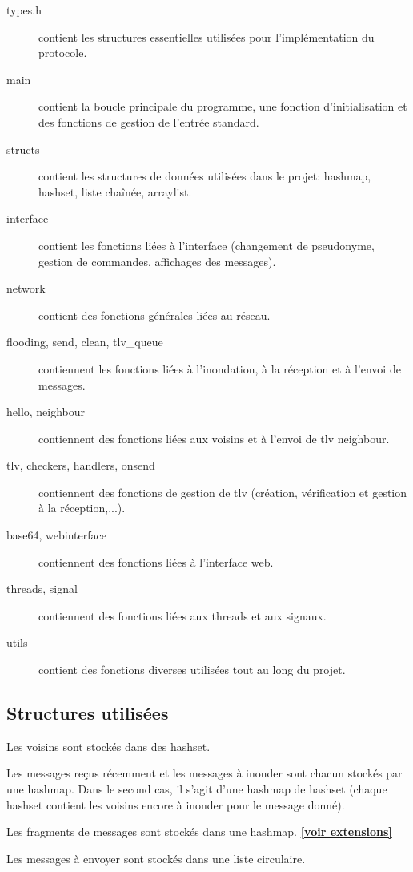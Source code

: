 \documentclass[a4paper,10pt]{article} %
\begin{document}
\begin{description}
\item[types.h] contient les structures essentielles utilisées pour l'implémentation du protocole.
\item[main] contient la boucle principale du programme, une fonction d'initialisation et des fonctions de gestion de l'entrée standard.
\item[structs] contient les structures de données utilisées dans le projet: hashmap, hashset, liste chaînée, arraylist.
\item[interface] contient les fonctions liées à l'interface (changement de pseudonyme, gestion de commandes, affichages des messages).
\item[network] contient des fonctions générales liées au réseau.
\item[flooding, send, clean, tlv\_queue] contiennent les fonctions liées à l'inondation, à la réception et à l'envoi de messages.
\item[hello, neighbour] contiennent des fonctions liées aux voisins et à l'envoi de tlv neighbour.
\item[tlv, checkers, handlers, onsend] contiennent des fonctions de gestion de tlv (création, vérification et gestion à la réception,...).
\item[base64, webinterface] contiennent des fonctions liées à l'interface web.
\item[threads, signal] contiennent des fonctions liées aux threads et aux signaux.
\item[utils] contient des fonctions diverses utilisées tout au long du projet.
\end{description}

\subsection{Structures utilisées\label{sec:struct}}
Les voisins sont stockés dans des hashset.

Les messages reçus récemment et les messages à inonder sont chacun stockés par une hashmap. Dans le second cas, il s'agit d'une hashmap de hashset (chaque hashset contient les voisins encore à inonder pour le message donné).

Les fragments de messages sont stockés dans une hashmap. \hyperref[sec:frag]{\textbf{[voir extensions]}}

Les messages à envoyer sont stockés dans une liste circulaire.
\end{document}
